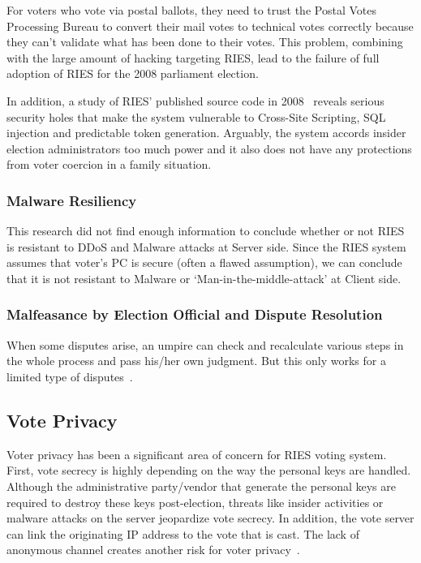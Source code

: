 For voters who vote via postal ballots, they need to trust the Postal Votes Processing Bureau to convert their mail votes to technical votes correctly because they can't validate what has been done to their votes. This problem, combining with the large amount of hacking targeting RIES, lead to the failure of full adoption of RIES for the 2008 parliament election.

In addition, a study of RIES' published source code in 2008~\cite{gonggrijp2009} reveals serious security holes that make the system vulnerable to Cross-Site Scripting, SQL injection and predictable token generation. Arguably, the system accords insider election administrators too much power and it also does not have any protections from voter coercion in a family situation.

\subsubsection{Malware Resiliency}

This research did not find enough information to conclude whether or not RIES is resistant to DDoS and Malware attacks at Server side. Since the RIES system assumes that voter's PC is secure (often a flawed assumption), we can conclude that it is not resistant to Malware or `Man-in-the-middle-attack' at Client side.

\subsubsection{Malfeasance by Election Official and Dispute Resolution}

When some disputes arise, an umpire can check and recalculate various steps in the whole process and pass his/her own judgment. But this only works for a limited type of disputes~\cite{hubbers2008}.

\subsection{Vote Privacy}

Voter privacy has been a significant area of concern for RIES voting system. First, vote secrecy is highly depending on the way the personal keys are handled. Although the administrative party/vendor that generate the personal keys are required to destroy these keys post-election, threats like insider activities or malware attacks on the server jeopardize vote secrecy. In addition, the vote server can link the originating IP address to the vote that is cast. The lack of anonymous channel creates another risk for voter privacy~\cite{hubbers2008}.

